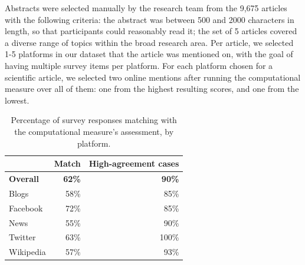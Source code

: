 \documentclass[letterpaper]{article} %
\begin{document}
Abstracts were selected manually by the research team from the 9,675 articles with the following criteria: the abstract was between 500 and 2000 characters in length, so that participants could reasonably read it; the set of 5 articles covered a diverse range of topics within the broad research area.
Per article, we selected 1-5 platforms in our dataset that the article was mentioned on, with the goal of having multiple survey items per platform. For each platform chosen for a scientific article, we selected two online mentions after running the computational measure over all of them: one from the highest resulting scores, and one from the lowest. %

\begin{table}[t]
\centering
\begin{tabular}{@{}l|r|r@{}}
& \textbf{Match} & \textbf{High-agreement cases} \\ \hline
\textbf{Overall} & \textbf{62\%} & \textbf{90\%} \\ \hline
{Blogs} & 58\% & 85\%\\ %
{Facebook} & 72\% & 85\% \\ %
{News} & 55\% & 90\% \\ %
{Twitter} & 63\% & 100\% \\ %
{Wikipedia} & 57\% & 93\% %
\end{tabular}
\caption{Percentage of survey responses matching with the computational measure's assessment, by platform.}
\label{tab:survey_items_platforms}
\end{table}
\end{document}
